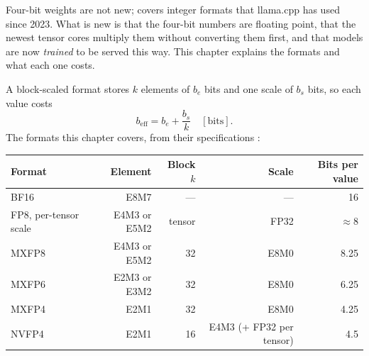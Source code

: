 Four-bit weights are not new;  covers integer
formats that llama.cpp has used since 2023. What is new is that the four-bit
numbers are floating point, that the newest tensor cores multiply them
without converting them first, and that models are now \emph{trained} to be
served this way. This chapter explains the formats and what each one costs.



A block-scaled format stores $k$ elements of $b_e$ bits and one scale of $b_s$
bits, so each value costs
\begin{equation}
b_{\text{eff}} = b_e + \frac{b_s}{k}\quad[\text{bits}].
\label{eq:bits-per-value}
\end{equation}
The formats this chapter covers, from their specifications
\cite{rouhani2023mx,nvidia2025nvfp4,micikevicius2022fp8}:

\begin{center}
\begin{tabular}{@{}lrrrr@{}}
\toprule
Format & Element & Block $k$ & Scale & Bits per value \\
\midrule
BF16 & E8M7 & --- & --- & 16 \\
FP8, per-tensor scale & E4M3 or E5M2 & tensor & FP32 & $\approx$8 \\
MXFP8 & E4M3 or E5M2 & 32 & E8M0 & 8.25 \\
MXFP6 & E2M3 or E3M2 & 32 & E8M0 & 6.25 \\
MXFP4 & E2M1 & 32 & E8M0 & 4.25 \\
NVFP4 & E2M1 & 16 & E4M3 (+ FP32 per tensor) & 4.5 \\
\bottomrule
\end{tabular}
\end{center}

